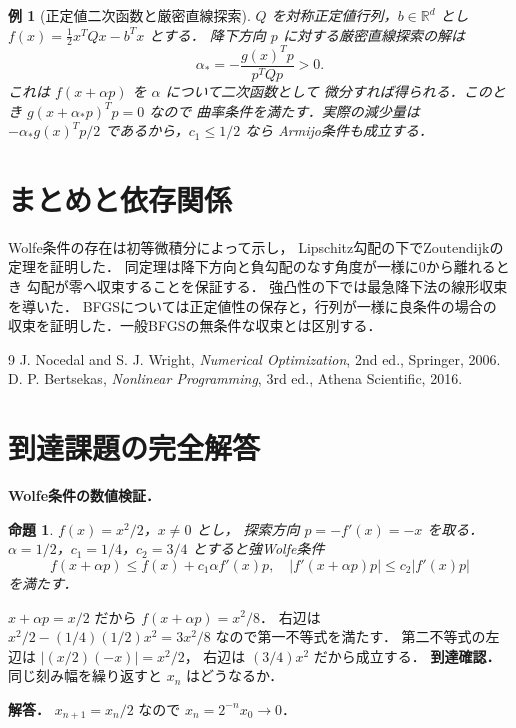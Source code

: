 \documentclass[a5paper,10pt,onecolumn]{jsarticle}
\makeatletter
\theoremstyle{mathnotetheorem}
\newtheorem{proposition}[theorem]{命題}
\newtheorem{example}[theorem]{例}
\renewcommand{\proofname}{証明}
\renewenvironment{proof}[1][\proofname]{%
  \par\pushQED{\qed}\normalfont\topsep4\p@\@plus2\p@\relax
  \trivlist\item[\hskip\labelsep\bfseries #1]\ignorespaces
}{\popQED\endtrivlist\@endpefalse}
\makeatother
\begin{document}
\begin{example}[正定値二次函数と厳密直線探索]
$Q$ を対称正定値行列，$b\in\mathbb R^d$ とし
$f(x)=\frac12x^TQx-b^Tx$ とする．
降下方向 $p$ に対する厳密直線探索の解は
\[
 \alpha_*=-\frac{g(x)^Tp}{p^TQp}>0.
\]
これは $f(x+\alpha p)$ を $\alpha$ について二次函数として
微分すれば得られる．このとき
$g(x+\alpha_*p)^Tp=0$ なので
曲率条件を満たす．実際の減少量は
$-\alpha_*g(x)^Tp/2$ であるから，$c_1\le1/2$ なら
Armijo条件も成立する．
\end{example}

\section{まとめと依存関係}
Wolfe条件の存在は初等微積分によって示し，
Lipschitz勾配の下でZoutendijkの定理を証明した．
同定理は降下方向と負勾配のなす角度が一様に0から離れるとき
勾配が零へ収束することを保証する．
強凸性の下では最急降下法の線形収束を導いた．
BFGSについては正定値性の保存と，行列が一様に良条件の場合の
収束を証明した．一般BFGSの無条件な収束とは区別する．

\begin{thebibliography}{9}
 J. Nocedal and S. J. Wright,
 \emph{Numerical Optimization}, 2nd ed., Springer, 2006.
 D. P. Bertsekas,
 \emph{Nonlinear Programming}, 3rd ed., Athena Scientific, 2016.
\end{thebibliography}

\section{到達課題の完全解答}
\noindent\textbf{Wolfe条件の数値検証．}
\begin{proposition}
$f(x)=x^2/2$，$x\ne0$ とし，
探索方向 $p=-f'(x)=-x$ を取る．
$\alpha=1/2$，$c_1=1/4$，$c_2=3/4$
とすると強Wolfe条件
\[
f(x+\alpha p)\le f(x)+c_1\alpha f'(x)p,
\quad
|f'(x+\alpha p)p|\le c_2|f'(x)p|
\]
を満たす．
\end{proposition}
\begin{proof}
$x+\alpha p=x/2$ だから
$f(x+\alpha p)=x^2/8$．
右辺は
$x^2/2-(1/4)(1/2)x^2=3x^2/8$
なので第一不等式を満たす．
第二不等式の左辺は
$|(x/2)(-x)|=x^2/2$，
右辺は $(3/4)x^2$ だから成立する．
\end{proof}
\noindent\textbf{到達確認．}
同じ刻み幅を繰り返すと $x_n$ はどうなるか．
\par\noindent\textbf{解答．}
$x_{n+1}=x_n/2$ なので
$x_n=2^{-n}x_0\to0$．
\end{document}
